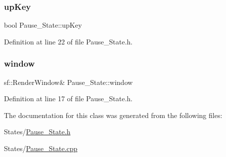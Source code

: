 \subsubsection{\texorpdfstring{up\+Key}{upKey}}
{\footnotesize\ttfamily bool Pause\+\_\+\+State\+::up\+Key}



Definition at line 22 of file Pause\+\_\+\+State.\+h.

\hypertarget{class_pause___state_ab76c9a293588f479baccdb7843869291}{}\label{class_pause___state_ab76c9a293588f479baccdb7843869291} 
\subsubsection{\texorpdfstring{window}{window}}
{\footnotesize\ttfamily sf\+::\+Render\+Window\& Pause\+\_\+\+State\+::window}



Definition at line 17 of file Pause\+\_\+\+State.\+h.



The documentation for this class was generated from the following files\+:\begin{DoxyCompactItemize}
\item 
States/\hyperlink{_pause___state_8h}{Pause\+\_\+\+State.\+h}\item 
States/\hyperlink{_pause___state_8cpp}{Pause\+\_\+\+State.\+cpp}\end{DoxyCompactItemize}
